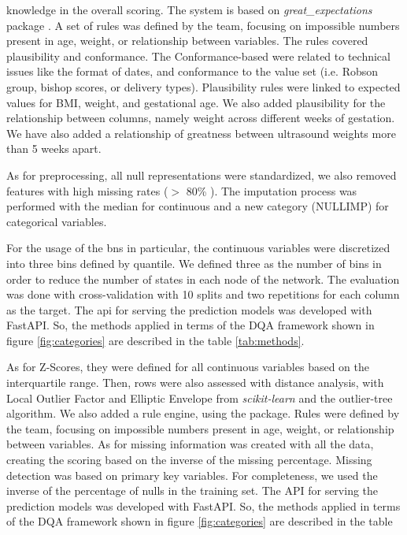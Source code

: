 knowledge in the overall scoring. The system is based on \textit{great\_expectations} package \cite{GXProactiveCollaborative}. A set of rules was defined by the team, focusing on impossible numbers present in age, weight, or relationship between variables. The rules covered plausibility and conformance. The Conformance-based were related to technical issues like the format of dates, and conformance to the value set (i.e. Robson group, bishop scores, or delivery types). Plausibility rules were linked to expected values for BMI, weight, and gestational age. We also added plausibility for the relationship between columns, namely weight across different weeks of gestation. We have also added a relationship of greatness between ultrasound weights more than 5 weeks apart. 

As for preprocessing, all null representations were standardized, we also removed features with high missing rates ($>$ 80\% ). The imputation process was performed with the median for continuous and a new category (NULLIMP) for categorical variables. 

For the usage of the \acp{bn} in particular, the continuous variables were discretized into three bins defined by quantile. We defined three as the number of bins in order to reduce the number of states in each node of the network. The evaluation was done with cross-validation with 10 splits and two repetitions for each column as the target.
The \ac{api} for serving the prediction models was developed with FastAPI. So, the methods applied in terms of the DQA framework shown in figure \ref{fig:categories} are described in the table \ref{tab:methods}.


As for  Z-Scores, they were defined for all continuous variables based on the interquartile range. Then, rows were also assessed with distance analysis, with Local Outlier Factor and Elliptic Envelope from \textit{scikit-learn} and the outlier-tree algorithm. We also added a rule engine, using the  package. Rules were defined by the team, focusing on impossible numbers present in age, weight, or relationship between variables. As for missing information was created with all the data, creating the scoring based on the inverse of the missing percentage. Missing detection was based on primary key variables. For completeness, we used the inverse of the percentage of nulls in the training set.
The API for serving the prediction models was developed with FastAPI. So, the methods applied in terms of the DQA framework shown in figure \ref{fig:categories} are described in the table 

